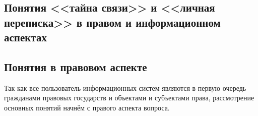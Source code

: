 \parindent=1cm %
\begin{center}
		
		\section{Понятия <<тайна связи>> и <<личная переписка>> в правом и информационном аспектах}
		
\end{center}

\subsection{Понятия в правовом аспекте} 

Так как все пользователь информационных систем являются в первую очередь гражданами правовых государств и объектами и субъектами права, рассмотрение основных понятий начнём с правого аспекта вопроса.

 
\newpage %